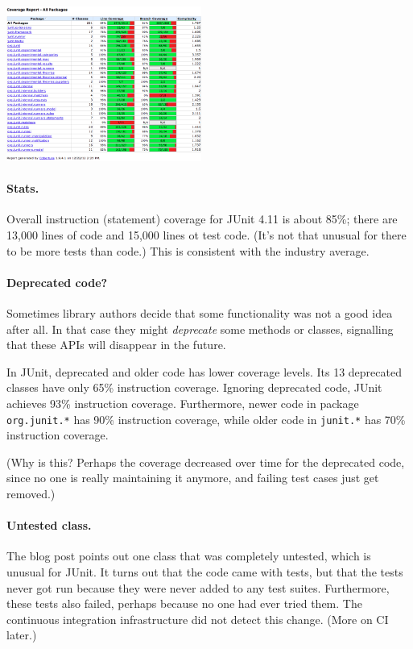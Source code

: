 \documentclass[11pt]{article}
\begin{document}
\begin{center}
  \includegraphics[height=2in]{L03/cobertura-junit.png}
\end{center}

\paragraph{Stats.} Overall instruction (statement) coverage for JUnit 4.11 is about 85\%; there are
13,000 lines of code and 15,000 lines ot test code. (It's not that
unusual for there to be more tests than code.) This is consistent with
the industry average.

\paragraph{Deprecated code?} Sometimes library authors decide that some functionality
was not a good idea after all. In that case they might \emph{deprecate} some methods or
classes, signalling that these APIs will disappear in the future.

In JUnit, deprecated and older code has lower coverage levels. Its 13 deprecated
classes have only 65\% instruction coverage. Ignoring deprecated code, JUnit achieves
93\% instruction coverage. Furthermore, newer code in
package {\tt org.junit.*} has 90\% instruction coverage, while older code in
{\tt junit.*} has 70\% instruction coverage.

(Why is this? Perhaps the coverage decreased over time for the deprecated code, since
no one is really maintaining it anymore, and failing test cases just get removed.)

\paragraph{Untested class.} The blog post points out one class that was completely
untested, which is unusual for JUnit. It turns out that the code came with tests,
but that the tests never got run because they were never added to any test suites.
Furthermore, these tests also failed, perhaps because no one had ever tried them.
The continuous integration infrastructure did not detect this change. (More on CI
later.)
\end{document}
